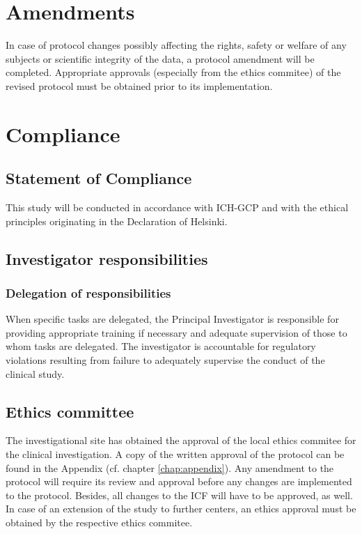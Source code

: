 \section{Amendments}
In case of protocol changes possibly affecting the rights, safety or welfare of any subjects or scientific integrity of the data, a protocol amendment will be completed. Appropriate approvals (especially from the ethics commitee) of the revised protocol must be obtained prior to its implementation.

\section{Compliance}
\subsection{Statement of Compliance}
This study will be conducted in accordance with ICH-GCP and with the ethical principles originating in the Declaration of Helsinki. 

\subsection{Investigator responsibilities}

\subsubsection{Delegation of responsibilities}
When specific tasks are delegated, the Principal Investigator is responsible for providing appropriate training if necessary and adequate supervision of those to whom tasks are delegated. The investigator is accountable for regulatory violations resulting from failure to adequately supervise the conduct of the clinical study. 

\subsection{Ethics committee}
The investigational site has obtained the approval of the local ethics commitee for the clinical investigation. A copy of the written approval of the protocol can be found in the Appendix (cf. chapter \ref{chap:appendix}). Any amendment to the protocol will require its review and approval before any changes are implemented to the protocol. Besides, all changes to the \ac{ICF} will have to be approved, as well. In case of an extension of the study to further centers, an ethics approval must be obtained by the respective ethics commitee. 

